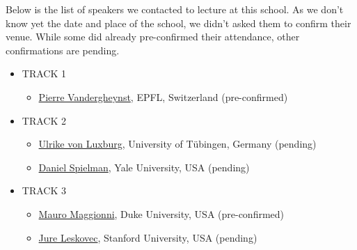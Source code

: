 \documentclass[a4paper]{scrartcl}
\begin{document}
Below is the list of speakers we contacted to lecture at this school. As we
don't know yet the date and place of the school, we didn't asked them to confirm
their venue. While some did already pre-confirmed their attendance, other
confirmations are pending.
\begin{itemize}
\setlength{\itemsep}{0pt} \setlength{\parskip}{0pt}
\item TRACK 1
	\begin{itemize}
	\setlength{\itemsep}{0pt} \setlength{\parskip}{0pt}
	\item \href{http://people.epfl.ch/pierre.vandergheynst}
		{Pierre Vandergheynst}, EPFL, Switzerland
		(pre-confirmed)
	\end{itemize}
\item TRACK 2
	\begin{itemize}
	\setlength{\itemsep}{0pt} \setlength{\parskip}{0pt}
	\item \href{http://www.wsi.uni-tuebingen.de/lehrstuehle/theory-of-machine-learning/people/ulrike-von-luxburg.htmli}
		{Ulrike von Luxburg}, University of Tübingen, Germany
		(pending)
	\item \href{http://www.cs.yale.edu/homes/spielman/}
		{Daniel Spielman}, Yale University, USA
		(pending)
	\end{itemize}
\item TRACK 3
	\begin{itemize}
	\setlength{\itemsep}{0pt} \setlength{\parskip}{0pt}
	\item \href{http://services.math.duke.edu/~mauro/}
		{Mauro Maggionni}, Duke University, USA
		(pre-confirmed)
	\item \href{http://cs.stanford.edu/people/jure/}
		{Jure Leskovec}, Stanford University, USA
		(pending)
	\end{itemize}
\end{itemize}
\end{document}
